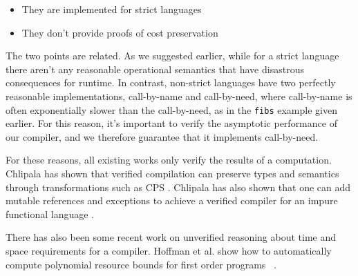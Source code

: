 \begin{itemize}
\item They are implemented for strict languages
\item They don't provide proofs of cost preservation 
\end{itemize}

The two points are related. As we suggested earlier, while for a strict language
there aren't any reasonable operational semantics that have disastrous
consequences for runtime. In contrast, non-strict languages have two perfectly
reasonable implementations, call-by-name and call-by-need, where call-by-name is
often exponentially slower than the call-by-need, as in the \texttt{fibs}
example given earlier. For this reason, it's important to verify the asymptotic
performance of our compiler, and we therefore guarantee that it implements
call-by-need. 

For these reasons, all existing works only verify the results of a computation.
Chlipala has shown that verified compilation can preserve types and semantics
through transformations such as CPS \cite{chlipala}. Chlipala has also shown
that one can add mutable references and exceptions to achieve a verified
compiler for an impure functional language \cite{chlipalaimpure}.  

There has also been some recent work on unverified reasoning about time and
space requirements for a compiler. Hoffman et al. show how to automatically
compute polynomial resource bounds for first order programs
~\cite{hoffmanresource}. 


